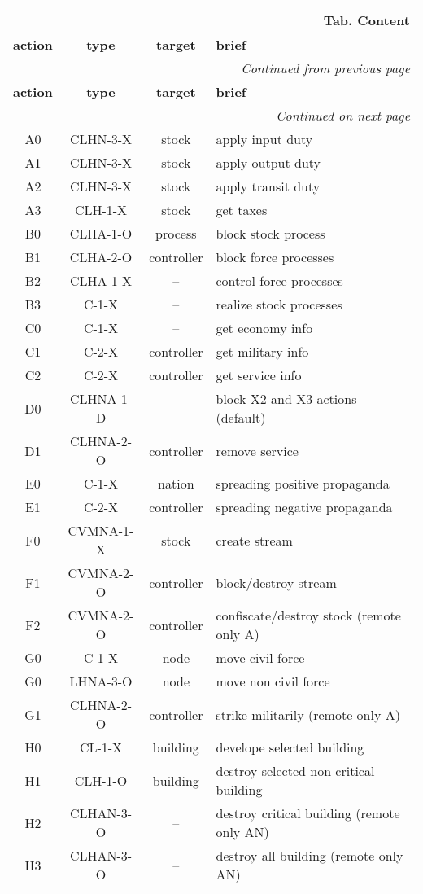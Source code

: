 \documentclass[a4paper,oneside,titlepage]{report}
\newcommand*{\LTHeaderIV}[5]{
  \multicolumn{4}{r}{\textbf{Tab. \thesubsection} \textbf{#1}}\\    
  \hline
  \textbf{#2} & \textbf{#3} & \textbf{#4} & \textbf{#5}\\
  \hline
  
  \endfirsthead
  \multicolumn{4}{r}{\textit{Continued from previous page}}\\    
  \hline
  \textbf{#2} & \textbf{#3} & \textbf{#4} & \textbf{#5}\\
  \hline
  \endhead
  \hline
  \multicolumn{4}{r}{\textit{Continued on next page}}\\
  \endfoot
  \hline
  \endlastfoot  
}
\begin{document}
\vspace{-0.5cm}
\begin{longtable}{ |c|c|c|l| }    
  \LTHeaderIV{Content}{action}{type}{target}{brief}                    
  A0 & CLHN-3-X & stock & apply input duty\\
  A1 & CLHN-3-X & stock & apply output duty\\
  A2 & CLHN-3-X & stock & apply transit duty\\
  A3 & CLH-1-X  & stock & get taxes\\
  \hline
  B0 & CLHA-1-O & process    & block stock process\\
  B1 & CLHA-2-O & controller & block force processes\\
  B2 & CLHA-1-X & --         & control force processes\\
  B3 & C-1-X & --            & realize stock processes\\
  \hline
  C0 & C-1-X & --         & get economy info\\
  C1 & C-2-X & controller & get military info\\
  C2 & C-2-X & controller & get service info\\
  \hline
  D0 & CLHNA-1-D & --         & block X2 and X3 actions (default)\\
  D1 & CLHNA-2-O & controller & remove service\\
  \hline
  E0 & C-1-X & nation     & spreading positive propaganda\\
  E1 & C-2-X & controller & spreading negative propaganda\\
  \hline
  F0 & CVMNA-1-X & stock      & create stream\\
  F1 & CVMNA-2-O & controller & block$/$destroy stream\\
  F2 & CVMNA-2-O & controller & confiscate$/$destroy stock (remote only A)\\
  \hline
  G0 & C-1-X     & node       & move civil force\\
  G0 & LHNA-3-O  & node       & move non civil force\\
  G1 & CLHNA-2-O & controller & strike militarily (remote only A)\\  
  \hline
  H0 & CL-1-X    & building & develope selected building\\
  H1 & CLH-1-O   & building & destroy selected non-critical building\\
  H2 & CLHAN-3-O & --       & destroy critical building (remote only AN)\\
  H3 & CLHAN-3-O & --       & destroy all building (remote only AN)\\

\end{longtable}
\end{document}
